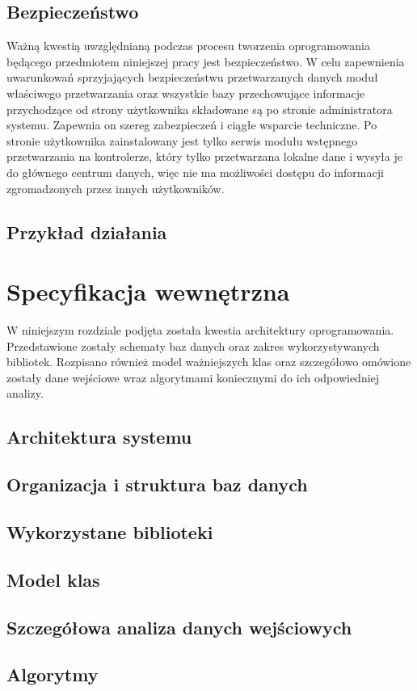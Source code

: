 \documentclass[a4paper]{book}
\begin{document}
\section{Bezpieczeństwo}
Ważną kwestią uwzględnianą podczas procesu tworzenia oprogramowania będącego przedmiotem niniejszej pracy jest bezpieczeństwo. W celu zapewnienia uwarunkowań sprzyjających bezpieczeństwu przetwarzanych danych moduł właściwego przetwarzania oraz wszystkie bazy przechowujące informacje przychodzące od strony użytkownika składowane są po stronie administratora systemu. Zapewnia on szereg zabezpieczeń i ciągłe wsparcie techniczne. Po stronie użytkownika zainstalowany jest tylko serwis modułu wstępnego przetwarzania na kontrolerze, który tylko przetwarzana lokalne dane i wysyła je do głównego centrum danych, więc nie ma możliwości dostępu do informacji zgromadzonych przez innych użytkowników.
\section{Przykład działania}

\chapter{Specyfikacja wewnętrzna}
W niniejszym rozdziale podjęta została kwestia architektury oprogramowania. Przedstawione zostały schematy baz danych oraz zakres wykorzystywanych bibliotek. Rozpisano również model ważniejszych klas oraz szczegółowo omówione zostały dane wejściowe wraz algorytmami koniecznymi do ich odpowiedniej analizy.
\section{Architektura systemu}
\section{Organizacja i struktura baz danych}
\section{Wykorzystane biblioteki}
\section{Model klas}
\section{Szczegółowa analiza danych wejściowych}
\section{Algorytmy}
\end{document}
